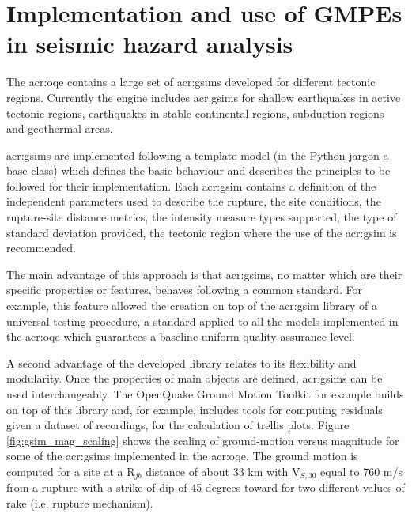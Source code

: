 %
\section{Implementation and use of GMPEs in seismic hazard analysis}
The \gls{acr:oqe} contains a large set of \glspl{acr:gsim}
developed for different tectonic regions. 
%
Currently the engine includes \glspl{acr:gsim} for shallow earthquakes
in active tectonic regions, earthquakes in stable continental regions,
subduction regions and geothermal areas.

\glspl{acr:gsim} are implemented following a template model (in the 
Python jargon a base class) which defines the basic behaviour and 
describes the principles to be followed for their implementation.
%
Each \gls{acr:gsim} contains a definition of the independent parameters
used to describe the rupture, the site conditions, the rupture-site
distance metrics, the intensity measure types supported, the type of 
standard deviation provided, the tectonic region where the use of the 
\gls{acr:gsim} is recommended.

The main advantage of this approach is that \glspl{acr:gsim}, no matter 
which are their specific properties or features, behaves following 
a common standard. 
%
For example, this feature allowed the creation on top of the 
\gls{acr:gsim} library of a universal testing procedure, a standard 
applied to all the models implemented in the \gls{acr:oqe} which 
guarantees a baseline uniform quality assurance level. 

A second advantage of the developed library relates to its flexibility 
and modularity. Once the properties of main objects are defined, 
\glspl{acr:gsim} can be used interchangeably. 
%
The OpenQuake Ground Motion Toolkit \parencite{weatherill2014} for 
example builds on top of this library and, for example, includes 
tools for computing residuals given a dataset of recordings, for 
the calculation of trellis plots.
%
Figure \ref{fig:gsim_mag_scaling} shows the scaling of ground-motion 
versus magnitude for some of the \glspl{acr:gsim} implemented in the 
\gls{acr:oqe}.
%
The ground motion is computed for a site at a R$_{jb}$ distance of 
about 33 km with V$_{S,30}$ equal to 760 m/s from a rupture with a 
strike of dip of 45 degrees toward for two different values of rake 
(i.e. rupture mechanism).


